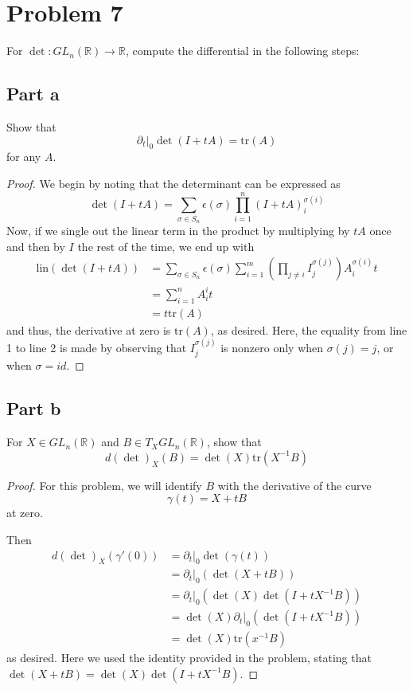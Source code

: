 \documentclass[fontsize=11pt]{scrartcl} %
\numberwithin{equation}{section} %
\numberwithin{figure}{section} %
\numberwithin{table}{section} %
\newcommand{\R}{\mathbb{R}}
\begin{document}
\newpage

\section*{Problem 7}
For $\det:GL_n(\R)\to\R$, compute the differential in the following steps:
\subsection*{Part a}
Show that
\[
    \partial_t|_0 \det(I+tA) = \textrm{tr}(A)
\]
for any $A$.
\\
\begin{proof}
We begin by noting that the determinant can be expressed as
    \[
        \det(I+tA) = \sum_{\sigma\in
        S_n}\epsilon(\sigma)\prod_{i=1}^{n}(I+tA)_i^{\sigma(i)}
    \]
    Now, if we single out the linear term in the product by multiplying by $tA$
    once and then by $I$ the rest of the time, we end up with
    \[
        \begin{aligned}
            \textrm{lin}(\det(I+tA)) &= \sum_{\sigma\in S_n}
        \epsilon(\sigma)\sum_{i=1}^m(\prod_{j\neq
        i}I_j^{\sigma(j)})A_i^{\sigma(i)}t\\
            &= \sum_{i=1}^nA_i^it\\
            &=t\textrm{tr}(A)
        \end{aligned}
    \]
    and thus, the derivative at zero is $\textrm{tr}(A)$, as desired.
    Here, the equality from line 1 to line 2 is made by observing that
    $I_j^{\sigma(j)}$ is nonzero only when $\sigma(j)=j$, or when $\sigma=id$.
\end{proof}

\subsection*{Part b}
For $X\in GL_n(\R)$ and $B\in T_XGL_n(\R)$, show that
\[
    d(\det)_X(B) = \det(X)\textrm{tr}(X^{-1}B)
\]

\begin{proof}
For this problem, we will identify $B$ with the derivative of the curve
    \[
        \gamma(t) = X+tB
    \]
    at zero.

    Then
    \[
        \begin{aligned}
            d(\det)_X(\gamma'(0)) &= \partial_t|_0 \det(\gamma(t))\\
                            &= \partial_t|_0(\det(X+tB))\\
                            &= \partial_t|_0(\det(X)\det(I+tX^{-1}B))\\
                            &= \det(X)\partial_t|_0(\det(I+tX^{-1}B))\\
                            &= \det(X)\textrm{tr}(x^{-1}B)
        \end{aligned}
    \]  
    as desired. Here we used the identity provided in the problem, stating that
    $\det(X+tB) = \det(X)\det(I+tX^{-1}B)$.
\end{proof}
\end{document}
